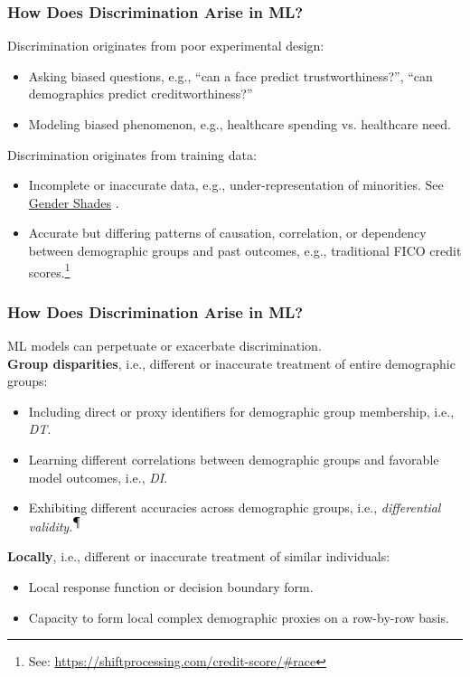 \documentclass[11pt,aspectratio=169,hyperref={colorlinks}]{beamer}
\begin{document}
		\begin{frame}				
			
			\frametitle{How Does Discrimination Arise in ML?}
			
			\noindent Discrimination originates from poor experimental design:\\
			\begin{itemize}
				\item Asking biased questions, e.g., “can a face predict trustworthiness?”, “can demographics predict creditworthiness?”
				\item Modeling biased phenomenon, e.g., healthcare spending vs. healthcare need. 
			\end{itemize}
			
			\noindent Discrimination originates from training data:\\
			\begin{itemize}
				\item Incomplete or inaccurate data, e.g., under-representation of minorities. See \href{http://gendershades.org/}{Gender Shades} \cite{gender_shades}.
				\item Accurate but differing patterns of causation, correlation, or dependency between demographic groups and past outcomes, e.g., traditional FICO credit scores.\footnote{\scriptsize{See: \url{https://shiftprocessing.com/credit-score/\#race}}}
			\end{itemize}

		\end{frame}

		\begin{frame}				
		
			\frametitle{How Does Discrimination Arise in ML?}
			
			ML models can perpetuate or exacerbate discrimination.\\
			\vspace{10pt}
			\noindent \textbf{Group disparities}, i.e., different or inaccurate treatment of entire demographic groups:\\
			\begin{itemize}
				\item Including direct or proxy identifiers for demographic group membership, i.e., \textit{DT}.
				\item Learning different correlations between demographic groups and favorable model outcomes, i.e., \textit{DI}.
				\item Exhibiting different accuracies across demographic groups, i.e., \textit{differential validity}.\textsuperscript{$\mathparagraph$}
			\end{itemize}
			\vspace{5pt}
			\noindent \textbf{Locally}, i.e., different or inaccurate treatment of similar individuals:\\
			\begin{itemize}
				\item Local response function or decision boundary form. 
				\item Capacity to form local complex demographic proxies on a row-by-row basis.
			\end{itemize}
							
		\end{frame}
\end{document}
